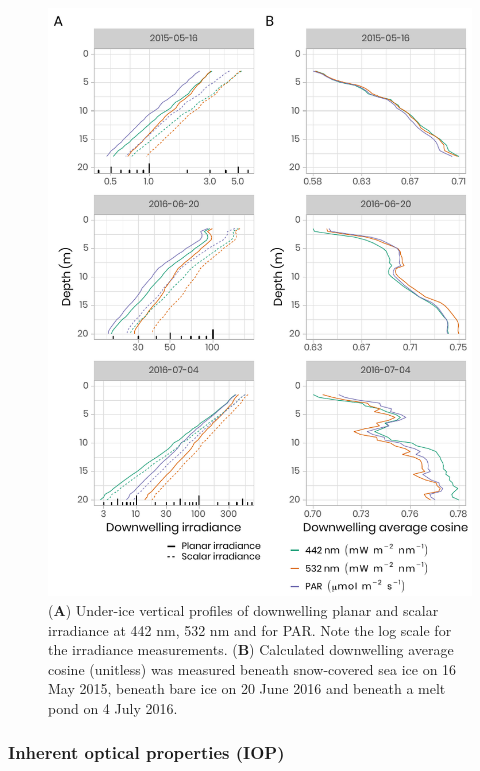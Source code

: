 \documentclass[essd, manuscript]{copernicus}
\begin{document}
\begin{figure}[H]
	\centering
	\includegraphics[scale = 1]{../../../graphs/fig06.pdf}
	\caption{(\textbf{A}) Under-ice vertical profiles of downwelling planar and scalar irradiance at 442 nm, 532 nm and for PAR. Note the log scale for the irradiance measurements. (\textbf{B}) Calculated downwelling average cosine (unitless) was measured beneath snow-covered sea ice on 16 May 2015, beneath bare ice on 20 June 2016 and beneath a melt pond on 4 July 2016.}
\end{figure}

\subsubsection{Inherent optical properties (IOP)}
\end{document}
